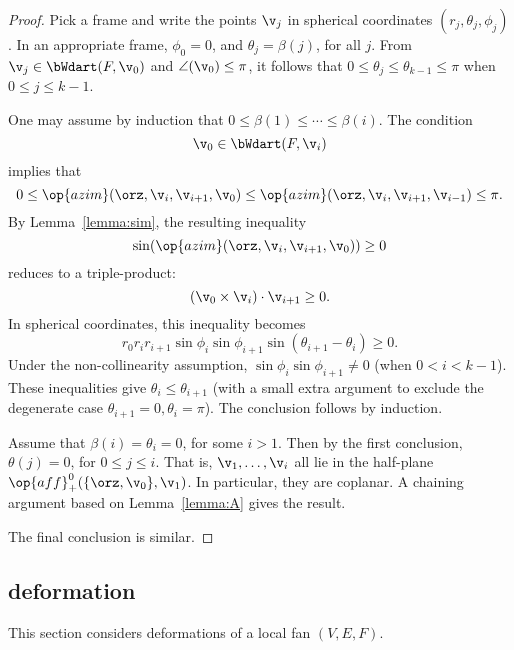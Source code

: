 \begin{proof}  
Pick a frame and write the points $\v_j$ in spherical coordinates
$(r_j,\theta_j,\phi_j)$.  In an appropriate frame, $\phi_0=0$, and
$\theta_j=\beta(j)$, for all $j$.  From $\v_j\in \bWdart(F,\v_0)$
and $\angle(\v_0)\le\pi$, it follows that
$0\le\theta_j\le\theta_{k-1}\le\pi$ when $0\le j\le k-1$.

One may assume by induction that $0\le \beta(1)\le\cdots\le
\beta(i)$.  The condition
\begin{displaymath}
\v_0\in \bWdart(F,\v_i)
\end{displaymath}
implies that
\begin{displaymath}
  0 \le \op{azim}(\orz,\v_i,\v_{i+1},\v_0)
\le \op{azim}(\orz,\v_i,\v_{i+1},\v_{i-1})\le\pi.
\end{displaymath}
By Lemma~\ref{lemma:sim}, the resulting inequality
\begin{displaymath}
\sin(\op{azim}(\orz,\v_i,\v_{i+1},\v_0))\ge 0
\end{displaymath}
reduces to a triple-product:
\begin{displaymath}
(\v_0 \times \v_i)\cdot \v_{i+1}\ge 0.
\end{displaymath}
In spherical coordinates, this inequality becomes
\begin{displaymath}
r_0r_ir_{i+1}\sin\phi_i\sin\phi_{i+1}\sin(\theta_{i+1}-\theta_i)\ge0.
\end{displaymath}
Under the non-collinearity assumption, $\sin\phi_i\sin\phi_{i+1}\ne0$
(when $0< i < k-1$).  These inequalities give
$\theta_i\le\theta_{i+1}$ (with a small extra argument to exclude the
degenerate case $\theta_{i+1}=0,\theta_i=\pi$).  The conclusion
follows by induction.

Assume that $\beta(i)=\theta_i=0$, for some $i>1$.  Then by the first
conclusion, $\theta(j)=0$, for $0\le j\le i$.  That is, 
$\v_1,\ldots,\v_i$ all lie in the half-plane
$\op{aff}^0_+(\{\orz,\v_0\},\v_1)$.  In particular, they are coplanar.
A chaining argument based on Lemma~\ref{lemma:A} gives the result.

The final conclusion is similar.
\end{proof}



\subsection{deformation}\label{sec:deformation}

This section considers deformations of a local fan $(V,E,F)$.

